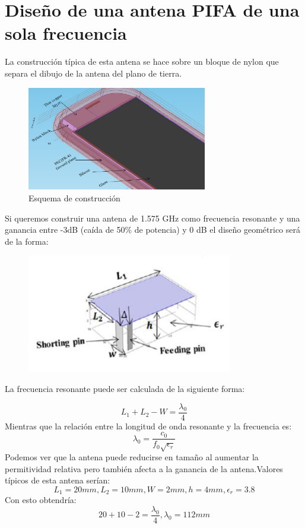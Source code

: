 \documentclass[a4paper,11pt,titlepage]{article}
\begin{document}
\section{Diseño de una antena PIFA de una sola frecuencia}
La construcción típica de esta antena se hace sobre un bloque de nylon que separa el dibujo de la antena del plano de tierra.
\begin{figure}[H]
\centering
\includegraphics[width=0.7\textwidth]{pifanylon}
\caption{Esquema de construcción}
\end{figure}
Si queremos construir una antena de 1.575 GHz como frecuencia resonante y una ganancia entre -3dB (caída de 50\% de potencia) y 0 dB el diseño geométrico será de la forma:
\begin{figure}[H]
\centering
\includegraphics[width=0.8\textwidth]{esquemapifa}
\end{figure}
\newpage
La frecuencia resonante puede ser calculada de la siguiente forma:\par
$$ L_1+L_2-W=\frac{\lambda_0}{4}$$
Mientras que la relación entre la longitud de onda resonante y la frecuencia es:
$$ \lambda_0=\frac{c_0}{f_0\sqrt{\epsilon_r}}$$
Podemos ver que la antena puede reducirse en tamaño al aumentar la permitividad relativa pero también afecta a la ganancia de la antena.Valores típicos de esta antena serían:
$$L_1=20mm, L_2=10mm, W=2mm, h=4mm, \epsilon_r=3.8$$
Con esto obtendría:
$$20+10-2=\frac{\lambda_0}{4}, \lambda_0=112mm$$
\end{document}
